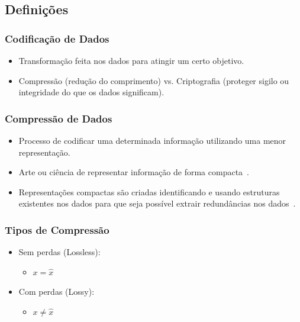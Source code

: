 \documentclass{beamer}
\begin{document}
\subsection{Definições}
\begin{frame}
\frametitle{Codificação de Dados}
\begin{itemize}
\item Transformação feita nos dados para atingir um certo objetivo.
\item Compressão (redução do comprimento) vs. Criptografia (proteger sigilo ou integridade do que os dados significam).
\end{itemize}
\end{frame}
\begin{frame}
\frametitle{Compressão de Dados}
\begin{itemize}
\item Processo de codificar uma determinada informação utilizando uma menor representação.
\item Arte ou ciência de representar informação de forma compacta~\cite{book_compression}.
\item Representações compactas são criadas identificando e usando estruturas existentes nos dados para que seja possível extrair redundâncias nos dados~\cite{book_compression}.
\end{itemize}
\end{frame}
\begin{frame}
\frametitle{Tipos de Compressão}
\begin{itemize}
\item Sem perdas (Lossless):
\begin{itemize}
\item $x = \hat{x}$
\end{itemize}
\item Com perdas (Lossy):
\begin{itemize}
\item $x \neq \hat{x}$
\end{itemize}
\end{itemize}
\end{frame}
\end{document}
